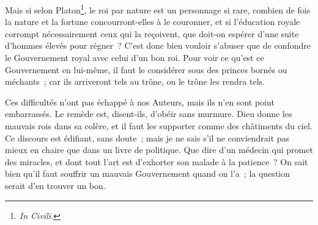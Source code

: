 \documentclass[french,twoside]{book} %
\begin{document}
Mais si selon Platon\footnote{{\itshape In Civili.}}, le roi par nature est un personnage si rare, combien de fois la nature et la fortune concourront-elles à le couronner, et si l’éducation royale corrompt nécessairement ceux qui la reçoivent, que doit-on espérer d’une suite d’hommes élevés pour régner ? C’est donc bien vouloir s’abuser que de confondre le Gouvernement royal avec celui d’un bon roi. Pour voir ce qu’est ce Gouvernement en lui-même, il faut le considérer sous des princes bornés ou méchants ; car ils arriveront tels au trône, ou le trône les rendra tels.\par
Ces difficultés n’ont pas échappé à nos Auteurs, mais ils n’en sont point embarrassés. Le remède est, disent-ils, d’obéir sans murmure. Dieu donne les mauvais rois dans sa colère, et il faut les supporter comme des châtiments du ciel. Ce discours est édifiant, sans doute ; mais je ne sais s’il ne conviendrait pas mieux en chaire que dans un livre de politique. Que dire d’un médecin qui promet des miracles, et dont tout l’art est d’exhorter son malade à la patience ? On sait bien qu’il faut souffrir un mauvais Gouvernement quand on l’a ; la question serait d’en trouver un bon.
\end{document}
